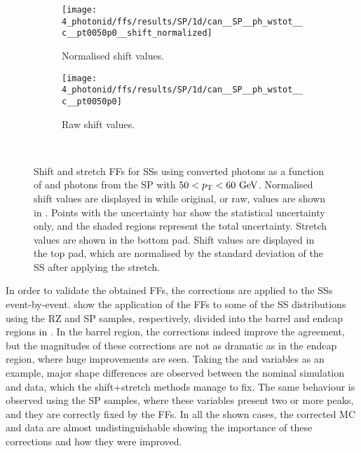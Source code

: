 \begin{figure}[ht!]
    \centering
    \begin{subfigure}[h]{0.49\linewidth}
        \centering
        \texttt{[image: 4\_photonid/ffs/results/SP/1d/can\_\_SP\_\_ph\_wstot\_\_c\_\_pt0050p0\_\_shift\_normalized]}
        \caption{Normalised shift values.}
        \label{fig:ss_corrections:ffs:reslts:ffs_eta_wstot:normalised_shift}
    \end{subfigure}
    \hfill
    \begin{subfigure}[h]{0.49\linewidth}
        \centering
        \texttt{[image: 4\_photonid/ffs/results/SP/1d/can\_\_SP\_\_ph\_wstot\_\_c\_\_pt0050p0]}
        \caption{Raw shift values.}
        \label{fig:ss_corrections:ffs:reslts:ffs_eta_wstot:raw_shift}
    \end{subfigure}\\
    \caption{Shift and stretch \acp{FF} for \wstot \acp{SS} using converted photons as a function of \abseta and photons from the \ac{SP} with \(50<p_{\text{T}}<60~\text{GeV}\). Normalised shift values are displayed in  while original, or raw, values are shown in . Points with the uncertainty bar show the statistical uncertainty only, and the shaded regions represent the total uncertainty. Stretch values are shown in the bottom pad. Shift values are displayed in the top pad, which are normalised by the standard deviation of the \ac{SS} after applying the stretch.}
    \label{fig:ss_corrections:ffs:reslts:ffs_eta_wstot}
\end{figure}


In order to validate the obtained \acp{FF}, the corrections are applied to the \acp{SS} event-by-event.
\Figs{\ref{fig:ss_corrections:ffs:results:ss_rz}}{\ref{fig:ss_corrections:ffs:results:ss_sp}} show the application of the \acp{FF} to some of the \ac{SS} distributions using the \ac{RZ} and \ac{SP} samples, respectively, divided into the barrel and endcap regions in \abseta. In the barrel region, the corrections indeed improve the agreement, but the magnitudes of these corrections are not as dramatic as in the endcap region, where huge improvements are seen. Taking the \wone and \wstot variables as an example, major shape differences are observed between the nominal simulation and data, which the shift+stretch methods manage to fix. The same behaviour is observed using the \ac{SP} samples, where these variables present two or more peaks, and they are correctly fixed by the \acp{FF}. In all the shown cases, the corrected \ac{MC} and data are almost undistinguishable showing the importance of these corrections and how they were improved.

